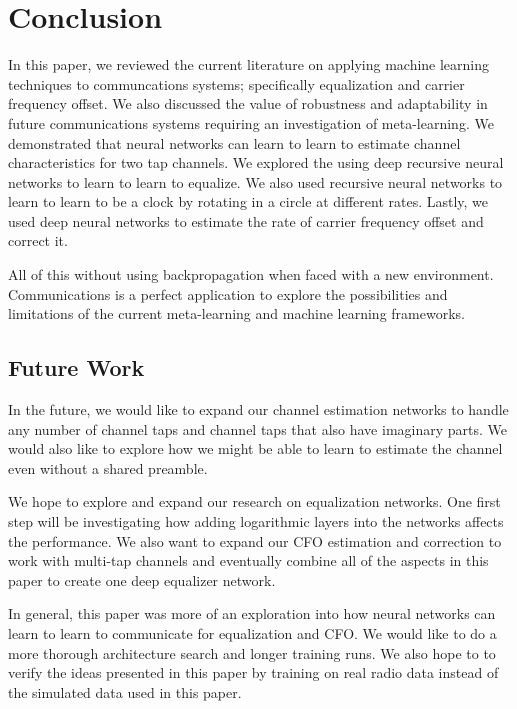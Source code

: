 \chapter{Conclusion}

In this paper, we reviewed the current literature on applying machine learning techniques to communcations systems; specifically equalization and carrier frequency offset.  We also discussed the value of robustness and adaptability in future communications systems requiring an investigation of meta-learning.
We demonstrated that neural networks can learn to learn to estimate channel characteristics for two tap channels.  We explored the using deep recursive neural networks to learn to learn to equalize.
We also used recursive neural networks to learn to learn to be a clock by rotating in a circle at different rates.  Lastly, we used deep neural networks to estimate the rate of carrier frequency offset and correct it.

All of this without using backpropagation when faced with a new environment.
Communications is a perfect application to explore the possibilities and limitations of the current meta-learning and machine learning frameworks.  


\section{Future Work}

In the future, we would like to expand our channel estimation networks to handle any number of channel taps and channel taps that also have imaginary parts.
We would also like to explore how we might be able to learn to estimate the channel even without a shared preamble.

We hope to explore and expand our research on equalization networks.  One first step will be investigating how adding logarithmic layers into the networks affects the performance.  We also want to expand our CFO estimation and correction to work with multi-tap channels and eventually combine all of the aspects in this paper to create one deep equalizer network.

In general, this paper was more of an exploration into how neural networks can learn to learn to communicate for equalization and CFO.  We would like to do a more thorough architecture search and longer training runs.  We also hope to to verify the ideas presented in this paper by training on real radio data instead of the simulated data used in this paper.